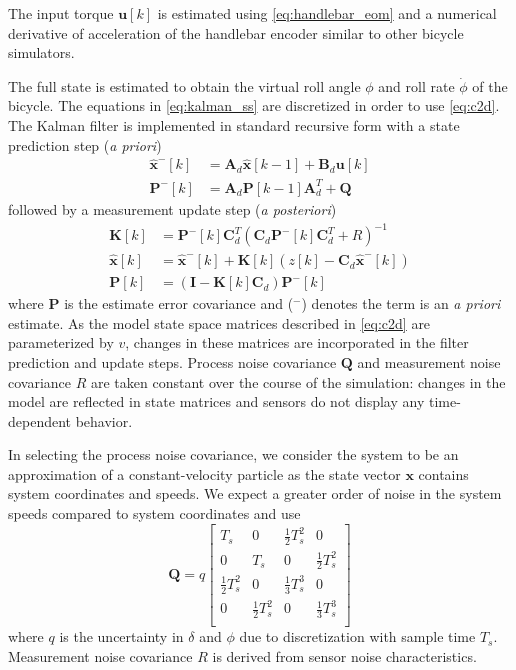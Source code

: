 \documentclass[11pt,a4paper,reqno]{amsart}
\newcommand{\state}{\bm{x}}
\newcommand{\sysInput}{\bm{u}}
\newcommand{\stateMat}{\bm{A}}
\newcommand{\inputMat}{\bm{B}}
\newcommand{\outputMat}{\bm{C}}
\newcommand{\stateEst}{\hat{\bm{x}}}
\newcommand{\meas}{z}
\newcommand{\processCov}{\bm{Q}}
\newcommand{\measCov}{R}
\newcommand{\kalmanGain}{\bm{K}}
\newcommand{\estimateCov}{\bm{P}}
\newcommand{\roll}{\phi}
\newcommand{\steer}{\delta}
\newcommand{\rollRate}{\dot{\phi}}
\begin{document}
The input torque $ \sysInput[k] $ is estimated using \autoref{eq:handlebar_eom} and a numerical derivative of
acceleration of the handlebar encoder similar to other bicycle simulators\cite{he2005}.

The full state is estimated to obtain the virtual roll angle $ \roll $ and roll rate $ \rollRate $ of the bicycle.
The equations in \autoref{eq:kalman_ss} are discretized in order to use \autoref{eq:c2d}.
The Kalman filter is implemented in standard recursive form with a state prediction step (\textit{a priori})
\begin{equation}
\begin{aligned}
    \stateEst^-[k] &= \stateMat_d \stateEst[k - 1] + \inputMat_d \sysInput[k] \\
    \estimateCov^-[k] &= \stateMat_d \estimateCov[k - 1] \stateMat_d^T + \processCov
\end{aligned}
\end{equation}
followed by a measurement update step (\textit{a posteriori})
\begin{equation}
\begin{aligned}
    \kalmanGain[k] &= \estimateCov^-[k] \outputMat_d^T (\outputMat_d \estimateCov^-[k] \outputMat_d^T + \measCov)^{-1} \\
    \stateEst[k] &= \stateEst^-[k] + \kalmanGain[k] (\meas[k] - \outputMat_d \stateEst^-[k] ) \\
    \estimateCov[k] &= (\bm{I} - \kalmanGain[k] \outputMat_d) \estimateCov^-[k]
\end{aligned}
\end{equation}
where $ \estimateCov $ is the estimate error covariance and ($ ^- $) denotes the term is an \textit{a priori} estimate.
As the model state space matrices described in \autoref{eq:c2d} are parameterized by $ v $, changes in these matrices
are incorporated in the filter prediction and update steps.
Process noise covariance $ \processCov $ and measurement noise covariance $ \measCov $ are taken constant over the
course of the simulation: changes in the model are reflected in state matrices and sensors do not display any
time-dependent behavior.

In selecting the process noise covariance, we consider the system to be an approximation of a constant-velocity
particle\cite{reid2001} as the state vector $ \state $ contains system coordinates and speeds.
We expect a greater order of noise in the system speeds compared to system coordinates and use
\begin{equation}
    \processCov = q \begin{bmatrix}
        T_s & 0 & \frac{1}{2}T_s^2 & 0 \\
        0 & T_s & 0 & \frac{1}{2}T_s^2 \\
        \frac{1}{2}T_s^2 & 0 & \frac{1}{3}T_s^3 & 0 \\
        0 & \frac{1}{2}T_s^2 & 0 & \frac{1}{3}T_s^3 \\
    \end{bmatrix}
\end{equation}
where $ q $ is the uncertainty in $ \steer $ and $ \roll $ due to discretization with sample time $ T_s $.
Measurement noise covariance $ \measCov $ is derived from sensor noise characteristics.
\end{document}
